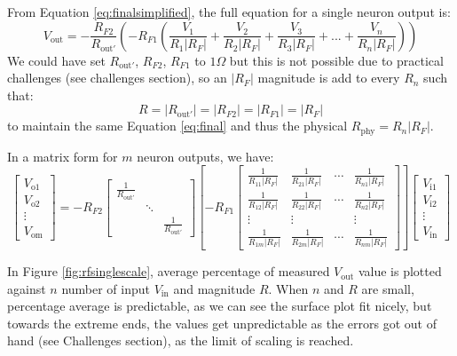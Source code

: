 From Equation \ref{eq:finalsimplified}, the full equation for a single neuron output is:
$$V_{\text{out}} =-\frac{R_{F2}}{R_{\text{out}'}}\left( -R_{F1}\left( \frac{V_1}{R_1\left| R_F\right| } + \frac{V_2}{R_2\left| R_F\right| } + \frac{V_3}{R_3\left| R_F\right| }+...+\frac{V_n}{R_n\left| R_F\right| }\right) \right) $$
We could have set $R_{\text{out}'}$, $R_{F2}$, $R_{F1}$ to $1\Omega$ but this is not possible due to practical challenges (see challenges section), so an $\left| R_F\right|$ magnitude is add to every $R_n$ such that:
\begin{equation}
\label{cond:rf}
R=\left|R_{\text{out}'}\right|=\left|R_{F2}\right|=\left|R_{F1}\right|=\left| R_F\right|
\end{equation} to maintain the same Equation \ref{eq:final} and thus the physical $R_{\text{phy}}=R_n\left| R_F\right|$.

In a matrix form for $m$ neuron outputs, we have:
$$\begin{bmatrix}
V_{\text{o1}} \\
V_{\text{o2}} \\
\vdots \\
V_{\text{om}}
\end{bmatrix}=-R_{F2}
\begin{bmatrix} 
\frac{1}{R_{\text{out}'}} &  &  \\
& \ddots & \\
&        & \frac{1}{R_{\text{out}'}}
\end{bmatrix}
\left[-R_{F1}\begin{bmatrix}
\frac{1}{R_{11}\left| R_F\right|} & \frac{1}{R_{21}\left| R_F\right|} & \cdots & \frac{1}{R_{n1}\left| R_F\right|} \\
\frac{1}{R_{12}\left| R_F\right|} & \frac{1}{R_{22}\left| R_F\right|} & \cdots & \frac{1}{R_{n2}\left| R_F\right|} \\
\vdots & \vdots & & \vdots \\
\frac{1}{R_{1m}\left| R_F\right|} & \frac{1}{R_{2m}\left| R_F\right|} & \cdots & \frac{1}{R_{nm}\left| R_F\right|}
\end{bmatrix}\right] 
\begin{bmatrix}
V_{\text{i1}} \\
V_{\text{i2}} \\
\vdots \\
V_{\text{in}}
\end{bmatrix}$$

In Figure \ref{fig:rfsinglescale}, average percentage of measured $V_{\text{out}}$ value is plotted against $n$ number of input $V_{\text{in}}$ and magnitude $R$. When $n$ and $R$ are small, percentage average is predictable, as we can see the surface plot fit nicely, but towards the extreme ends, the values get unpredictable as the errors got out of hand (see Challenges section), as the limit of scaling is reached.
